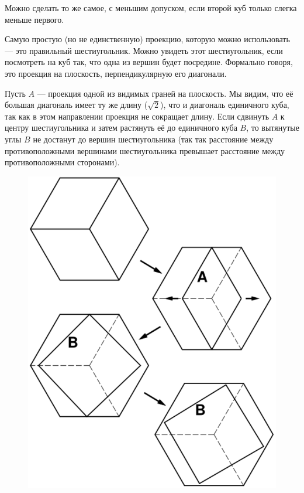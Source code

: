 Можно сделать то же самое, с меньшим допуском, если второй куб только слегка меньше первого.

Самую простую (но не единственную) проекцию, которую можно использовать --- это правильный шестиугольник.
Можно увидеть этот шестиугольник, если посмотреть на куб так, что одна из вершин будет посредине.
Формально говоря, это проекция на плоскость, перпендикулярную его диагонали.

Пусть $A$ --- проекция одной из видимых граней на плоскость.
Мы видим, что её большая диагональ имеет ту же длину ($\sqrt{2}$), что и диагональ единичного куба, так как в этом направлении проекция не сокращает длину.
Если сдвинуть $A$ к центру шестиугольника и затем растянуть её до единичного куба $B$, то вытянутые углы $B$ не достанут до вершин шестиугольника (так так расстояние между противоположными вершинами шестиугольника превышает расстояние между противоположными сторонами).

\begin{figure}[h!]
\centering
\includegraphics[scale=0.7]{Figs/Geometry/pass}
\end{figure}

